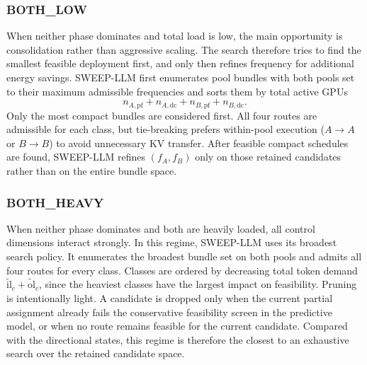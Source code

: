 \subsubsection*{\textnormal{ BOTH\_LOW}}
When neither phase dominates and total load is low, the main opportunity is consolidation rather than aggressive scaling.
The search therefore tries to find the smallest feasible deployment first, and only then refines frequency for additional energy savings.
SWEEP-LLM first enumerates pool bundles with both pools set to their maximum admissible frequencies and sorts them by total active GPUs
\[
n_{A,\mathrm{pf}} + n_{A,\mathrm{dc}} + n_{B,\mathrm{pf}} + n_{B,\mathrm{dc}}.
\]
Only the most compact bundles are considered first.
All four routes are admissible for each class, but tie-breaking prefers within-pool execution ($A{\to}A$ or $B{\to}B$) to avoid unnecessary KV transfer.
After feasible compact schedules are found, SWEEP-LLM refines $(f_A,f_B)$ only on those retained candidates rather than on the entire bundle space.

\subsubsection*{\textnormal{ BOTH\_HEAVY}}
When neither phase dominates and both are heavily loaded, all control dimensions interact strongly.
In this regime, SWEEP-LLM uses its broadest search policy.
It enumerates the broadest bundle set on both pools and admits all four routes for every class.
Classes are ordered by decreasing total token demand $\tilde{\mathrm{il}}_c + \tilde{\mathrm{ol}}_c$, since the heaviest classes have the largest impact on feasibility.
Pruning is intentionally light.
A candidate is dropped only when the current partial assignment already fails the conservative feasibility screen in the predictive model, or when no route remains feasible for the current candidate.
Compared with the directional states, this regime is therefore the closest to an exhaustive search over the retained candidate space.

